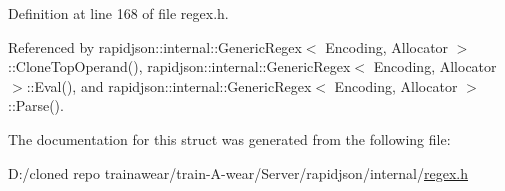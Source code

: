 Definition at line 168 of file regex.\+h.



Referenced by rapidjson\+::internal\+::\+Generic\+Regex$<$ Encoding, Allocator $>$\+::\+Clone\+Top\+Operand(), rapidjson\+::internal\+::\+Generic\+Regex$<$ Encoding, Allocator $>$\+::\+Eval(), and rapidjson\+::internal\+::\+Generic\+Regex$<$ Encoding, Allocator $>$\+::\+Parse().



The documentation for this struct was generated from the following file\+:\begin{DoxyCompactItemize}
\item 
D\+:/cloned repo trainawear/train-\/\+A-\/wear/\+Server/rapidjson/internal/\mbox{\hyperlink{regex_8h}{regex.\+h}}\end{DoxyCompactItemize}
